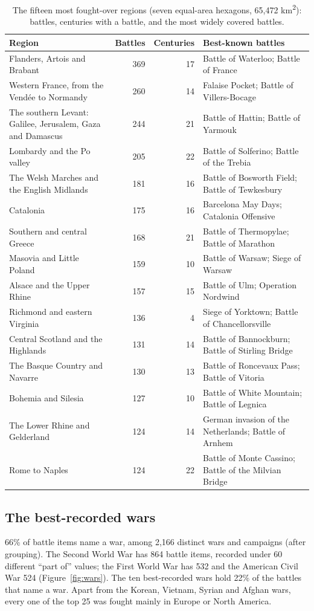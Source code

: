 \documentclass[11pt,a4paper]{article}
\begin{document}
\begin{table}[tbp]\centering\small\caption{The fifteen most fought-over regions (seven equal-area hexagons, 65,472 km\textsuperscript{2}): battles, centuries with a battle, and the most widely covered battles.}\label{tab:regions}\begin{tabular}{p{4.6cm}rrp{6.4cm}}\toprule Region & Battles & Centuries & Best-known battles\\\midrule
Flanders, Artois and Brabant & 369 & 17 & Battle of Waterloo; Battle of France\\
Western France, from the Vendée to Normandy & 260 & 14 & Falaise Pocket; Battle of Villers-Bocage\\
The southern Levant: Galilee, Jerusalem, Gaza and Damascus & 244 & 21 & Battle of Hattin; Battle of Yarmouk\\
Lombardy and the Po valley & 205 & 22 & Battle of Solferino; Battle of the Trebia\\
The Welsh Marches and the English Midlands & 181 & 16 & Battle of Bosworth Field; Battle of Tewkesbury\\
Catalonia & 175 & 16 & Barcelona May Days; Catalonia Offensive\\
Southern and central Greece & 168 & 21 & Battle of Thermopylae; Battle of Marathon\\
Masovia and Little Poland & 159 & 10 & Battle of Warsaw; Siege of Warsaw\\
Alsace and the Upper Rhine & 157 & 15 & Battle of Ulm; Operation Nordwind\\
Richmond and eastern Virginia & 136 & 4 & Siege of Yorktown; Battle of Chancellorsville\\
Central Scotland and the Highlands & 131 & 14 & Battle of Bannockburn; Battle of Stirling Bridge\\
The Basque Country and Navarre & 130 & 13 & Battle of Roncevaux Pass; Battle of Vitoria\\
Bohemia and Silesia & 127 & 10 & Battle of White Mountain; Battle of Legnica\\
The Lower Rhine and Gelderland & 124 & 14 & German invasion of the Netherlands; Battle of Arnhem\\
Rome to Naples & 124 & 22 & Battle of Monte Cassino; Battle of the Milvian Bridge\\
\bottomrule\end{tabular}\end{table}

\subsection{The best-recorded wars}
66\% of battle items name a war, among 2,166 distinct wars and campaigns (after grouping). The Second World War has 864 battle items, recorded under 60 different ``part of'' values; the First World War has 532 and the American Civil War 524 (Figure~\ref{fig:wars}). The ten best-recorded wars hold 22\% of the battles that name a war. Apart from the Korean, Vietnam, Syrian and Afghan wars, every one of the top 25 was fought mainly in Europe or North America.
\end{document}
